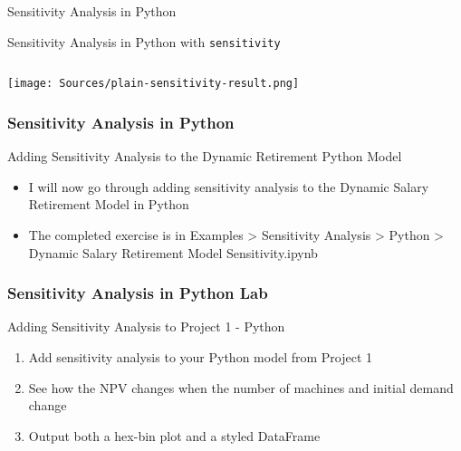 \documentclass[handout, 11pt]{beamer}
\begin{document}
\begin{section}[SA Python]{Sensitivity Analysis in Python}
\begin{frame}[fragile]
\begin{block}{Sensitivity Analysis in Python with \texttt{sensitivity}}
\begin{verbatim}
\end{verbatim}
\texttt{[image: Sources/plain-sensitivity-result.png]}
\end{block}
\end{frame}
\begin{frame}
\frametitle{Sensitivity Analysis in Python}
{
\begin{block}{Adding Sensitivity Analysis to the Dynamic Retirement Python Model}
\begin{itemize}
\item I will now go through adding sensitivity analysis to the Dynamic Salary Retirement Model in Python
\item The completed exercise is in Examples > Sensitivity Analysis > Python > Dynamic Salary Retirement Model Sensitivity.ipynb
\end{itemize}
\end{block}
}
\end{frame}
\begin{frame}
\frametitle{Sensitivity Analysis in Python Lab}
{
\begin{block}{Adding Sensitivity Analysis to Project 1 - Python}
\begin{enumerate}
\item Add sensitivity analysis to your Python model from Project 1
\item See how the NPV changes when the number of machines and initial demand change
\item Output both a hex-bin plot and a styled DataFrame
\end{enumerate}
\vfill
\end{block}
}
\label{labs:sensitivity-analysis-in-python-lab-1}
\end{frame}
\end{section}
\end{document}
